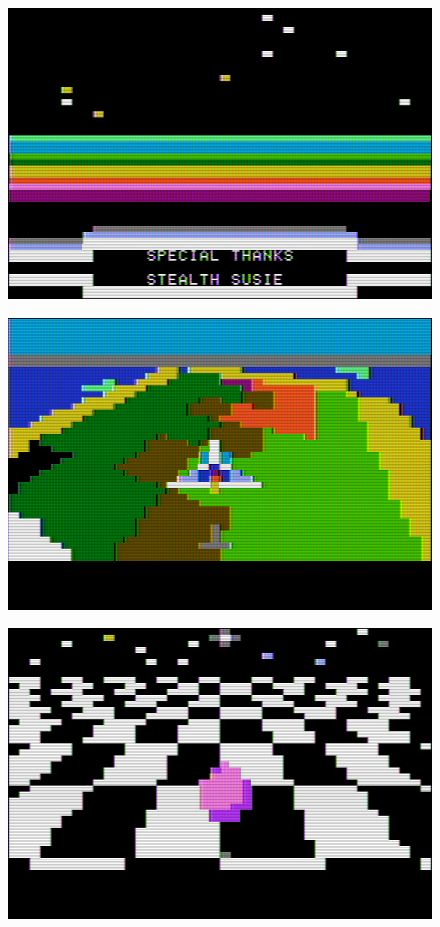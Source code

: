 \documentclass[twocolumn]{article}
\begin{document}
\begin{figure}
\includegraphics[width=\columnwidth]{figures/m7_screen2.jpg}
\end{figure}

\begin{figure}
\includegraphics[width=\columnwidth]{figures/m7_screen4.jpg}
\end{figure}

\begin{figure}
\includegraphics[width=\columnwidth]{figures/m7_screen1.jpg}
\end{figure}
\end{document}
